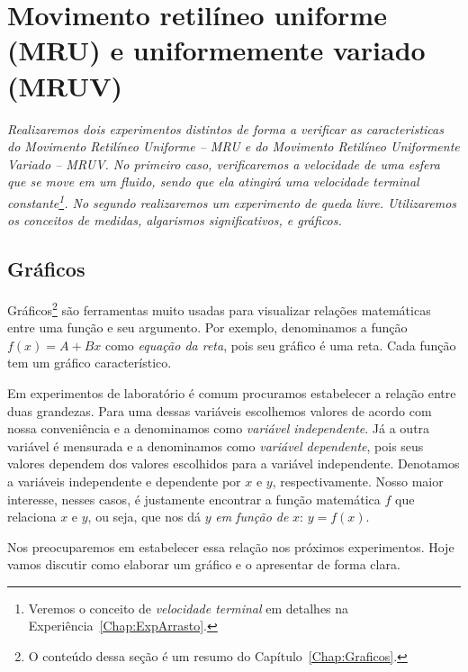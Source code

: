 \chapter{Movimento retilíneo uniforme (MRU) e uniformemente variado (MRUV)}
\label{Chap:ExpMRUMRUV}

\begin{fullwidth}\it
	Realizaremos dois experimentos distintos de forma a verificar as caracteristicas do Movimento Retilíneo Uniforme -- MRU e do Movimento Retilíneo Uniformente Variado -- MRUV. No primeiro caso, verificaremos a velocidade de uma esfera que se move em um fluido, sendo que ela atingirá uma velocidade terminal constante\footnote[][15mm]{Veremos o conceito de \emph{velocidade terminal} em detalhes na Experiência~\ref{Chap:ExpArrasto}.}. No segundo realizaremos um experimento de queda livre. Utilizaremos os conceitos de medidas, algarismos significativos, e gráficos.
\end{fullwidth}

\section{Gráficos}

Gráficos\footnote{O conteúdo dessa seção é um resumo do Capítulo~\ref{Chap:Graficos}.} são ferramentas muito usadas para visualizar relações matemáticas entre uma função e seu argumento. Por exemplo, denominamos a função $f(x) = A + Bx$ como \emph{equação da reta}, pois seu gráfico é uma reta. Cada função tem um gráfico característico. 

Em experimentos de laboratório é comum procuramos estabelecer a relação entre duas grandezas. Para uma dessas variáveis escolhemos valores de acordo com nossa conveniência e a denominamos como \emph{variável independente}. Já a outra variável é mensurada e a denominamos como \emph{variável dependente}, pois seus valores dependem dos valores escolhidos para a variável independente. Denotamos a variáveis independente e dependente por $x$ e $y$, respectivamente. Nosso maior interesse, nesses casos, é justamente encontrar a função matemática $f$ que relaciona $x$ e $y$, ou seja, que nos dá $y$ \emph{em função de} $x$: $y = f(x)$.

Nos preocuparemos em estabelecer essa relação nos próximos experimentos. Hoje vamos discutir como elaborar um gráfico e o apresentar de forma clara.

